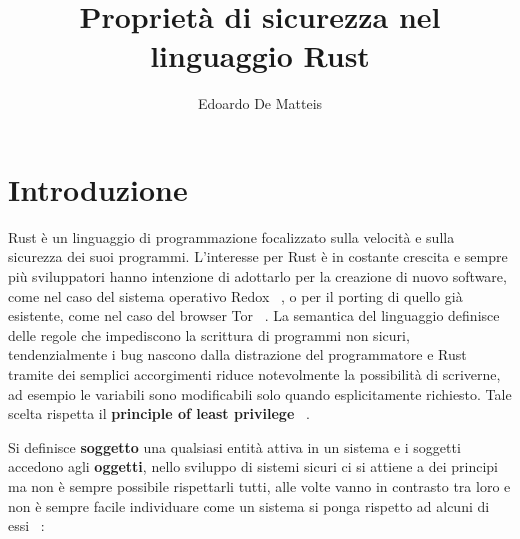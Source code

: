 \documentclass[Lau,binding=0.6cm]{sapthesis}
\title{Proprietà di sicurezza nel linguaggio Rust}
\author{Edoardo De Matteis}
\begin{document}
\frontmatter

\maketitle

\tableofcontents

\mainmatter

\chapter{Introduzione}
Rust è un linguaggio di programmazione focalizzato sulla velocità e sulla sicurezza dei suoi programmi.
L'interesse per Rust è in costante crescita e sempre più sviluppatori hanno intenzione di adottarlo per la creazione di nuovo software, come nel caso del sistema operativo Redox ~\cite{redox}, o per il porting di quello già esistente, come nel caso del browser Tor ~\cite{tor}.
La semantica del linguaggio definisce delle regole che impediscono la scrittura di programmi non sicuri, tendenzialmente i bug nascono dalla distrazione del programmatore e Rust tramite dei semplici accorgimenti riduce notevolmente la possibilità di scriverne, ad esempio le variabili sono modificabili solo quando esplicitamente richiesto.
Tale scelta rispetta il \textbf{principle of least privilege} ~\cite{security:saltzer}.

Si definisce \textbf{soggetto} una qualsiasi entità attiva in un sistema e i soggetti accedono agli \textbf{oggetti}, nello sviluppo di sistemi sicuri ci si attiene a dei principi ma non è sempre possibile rispettarli tutti, alle volte vanno in contrasto tra loro e non è sempre facile individuare come un sistema si ponga rispetto ad alcuni di essi ~\cite{gollmann:computersecurity}:
\end{document}
